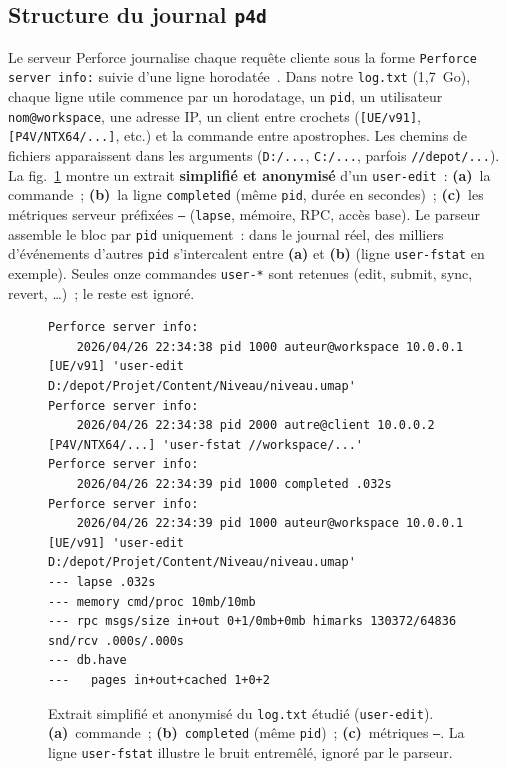 \documentclass[conference]{IEEEtran}
\begin{document}
\subsection{Structure du journal \texttt{p4d}}
Le serveur Perforce journalise chaque requête cliente sous la forme
\texttt{Perforce server info:} suivie d'une ligne
horodatée~\cite{perforce_p4d}. Dans notre \texttt{log.txt} (1,7~Go),
chaque ligne utile commence par un horodatage, un \texttt{pid}, un
utilisateur \texttt{nom@workspace}, une adresse IP, un client entre
crochets (\texttt{[UE/v91]}, \texttt{[P4V/NTX64/...]}, etc.) et la
commande entre apostrophes. Les chemins de fichiers apparaissent dans
les arguments (\texttt{D:/...}, \texttt{C:/...}, parfois
\texttt{//depot/...}). La fig.~\ref{fig:log} montre un extrait
\textbf{simplifié et anonymisé} d'un \texttt{user-edit}~:
\textbf{(a)}~la commande~; \textbf{(b)}~la ligne \texttt{completed}
(même \texttt{pid}, durée en secondes)~; \textbf{(c)}~les métriques
serveur préfixées \texttt{---} (\texttt{lapse}, mémoire, RPC, accès
base). Le parseur assemble le bloc par \texttt{pid} uniquement~: dans
le journal réel, des milliers d'événements d'autres \texttt{pid}
s'intercalent entre \textbf{(a)} et \textbf{(b)} (ligne
\texttt{user-fstat} en exemple). Seules onze commandes \texttt{user-*}
sont retenues (edit, submit, sync, revert, \ldots)~; le reste est
ignoré.

\begin{figure}[!t]
  \centering
  \begin{minipage}{\linewidth}
\begin{lstlisting}[style=p4log]
Perforce server info:
	2026/04/26 22:34:38 pid 1000 auteur@workspace 10.0.0.1 [UE/v91] 'user-edit D:/depot/Projet/Content/Niveau/niveau.umap'
Perforce server info:
	2026/04/26 22:34:38 pid 2000 autre@client 10.0.0.2 [P4V/NTX64/...] 'user-fstat //workspace/...'
Perforce server info:
	2026/04/26 22:34:39 pid 1000 completed .032s
Perforce server info:
	2026/04/26 22:34:39 pid 1000 auteur@workspace 10.0.0.1 [UE/v91] 'user-edit D:/depot/Projet/Content/Niveau/niveau.umap'
--- lapse .032s
--- memory cmd/proc 10mb/10mb
--- rpc msgs/size in+out 0+1/0mb+0mb himarks 130372/64836 snd/rcv .000s/.000s
--- db.have
---   pages in+out+cached 1+0+2
\end{lstlisting}
  \end{minipage}
  \caption{Extrait simplifié et anonymisé du \texttt{log.txt} étudié
    (\texttt{user-edit}). \textbf{(a)}~commande~;
    \textbf{(b)}~\texttt{completed} (même \texttt{pid})~;
    \textbf{(c)}~métriques \texttt{---}. La ligne \texttt{user-fstat}
    illustre le bruit entremêlé, ignoré par le parseur.}
  \label{fig:log}
\end{figure}
\end{document}
